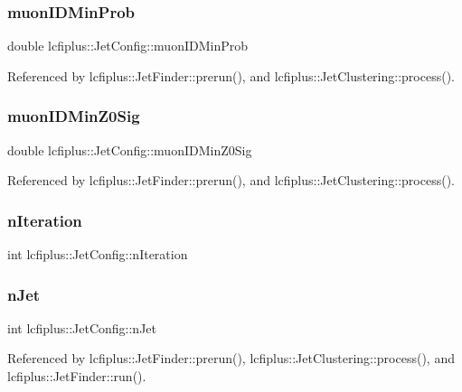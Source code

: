 \subsubsection{muon\+I\+D\+Min\+Prob}
{\footnotesize\ttfamily double lcfiplus\+::\+Jet\+Config\+::muon\+I\+D\+Min\+Prob}



Referenced by lcfiplus\+::\+Jet\+Finder\+::prerun(), and lcfiplus\+::\+Jet\+Clustering\+::process().

\mbox{\label{structlcfiplus_1_1JetConfig_a158738f113e4e91deda8fabc8f90f8f6}} 
\subsubsection{muon\+I\+D\+Min\+Z0\+Sig}
{\footnotesize\ttfamily double lcfiplus\+::\+Jet\+Config\+::muon\+I\+D\+Min\+Z0\+Sig}



Referenced by lcfiplus\+::\+Jet\+Finder\+::prerun(), and lcfiplus\+::\+Jet\+Clustering\+::process().

\mbox{\label{structlcfiplus_1_1JetConfig_afc280770bc3679f3234754b28d06de1d}} 
\subsubsection{n\+Iteration}
{\footnotesize\ttfamily int lcfiplus\+::\+Jet\+Config\+::n\+Iteration}

\mbox{\label{structlcfiplus_1_1JetConfig_a939185842313b5d6dd43ba2af1e5e77d}} 
\subsubsection{n\+Jet}
{\footnotesize\ttfamily int lcfiplus\+::\+Jet\+Config\+::n\+Jet}



Referenced by lcfiplus\+::\+Jet\+Finder\+::prerun(), lcfiplus\+::\+Jet\+Clustering\+::process(), and lcfiplus\+::\+Jet\+Finder\+::run().

